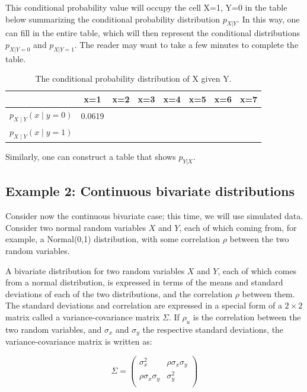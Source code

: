 \documentclass[
  12pt,
]{krantz}
\theoremstyle{definition}
\theoremstyle{definition}
\theoremstyle{definition}
\theoremstyle{definition}
\theoremstyle{remark}
\begin{document}
This conditional probability value will occupy the cell X=1, Y=0 in the table below summarizing the conditional probability distribution \(p_{X|Y}\). In this way, one can fill in the entire table, which will then represent the conditional distributions \(p_{X|Y=0}\) and \(p_{X|Y=1}\). The reader may want to take a few minutes to complete the table.

\begin{table}[!htbp]
\begin{center}
\begin{tabular}{c|ccccccc}
    & x=1 & x=2 & x=3 & x=4 & x=5 & x=6 & x=7\\ 
\hline  
$p_{X\mid Y}(x\mid y=0)$  & 0.0619 &  & & & & & \\
$p_{X\mid Y}(x\mid y=1)$  &  &  & & & & &  \\
\end{tabular}
\end{center}
\caption{The conditional probability distribution of X given Y.}
\label{XgivenY}
\end{table}

Similarly, one can construct a table that shows \(p_{Y|X}\).

\hypertarget{example-2-continuous-bivariate-distributions}{%
\subsection{Example 2: Continuous bivariate distributions}\label{example-2-continuous-bivariate-distributions}}

Consider now the continuous bivariate case; this time, we will use simulated data. Consider two normal random variables \(X\) and \(Y\), each of which coming from, for example, a Normal(0,1) distribution, with some correlation \(\rho\) between the two random variables.

A bivariate distribution for two random variables \(X\) and \(Y\), each of which comes from a normal distribution, is expressed in terms of the means and standard deviations of each of the two distributions, and the correlation \(\rho\) between them. The standard deviations and correlation are expressed in a special form of a \(2\times 2\) matrix called a variance-covariance matrix \(\Sigma\). If \(\rho_u\) is the correlation between the two random variables, and \(\sigma _{x}\) and \(\sigma _{y}\) the respective standard deviations, the variance-covariance matrix is written as:

\begin{equation}\label{eq:covmatfoundations}
\Sigma
=
\begin{pmatrix}
\sigma _{x}^2  & \rho\sigma _{x}\sigma _{y}\\
\rho\sigma _{x}\sigma _{y}    & \sigma _{y}^2\\
\end{pmatrix}
\end{equation}
\end{document}
